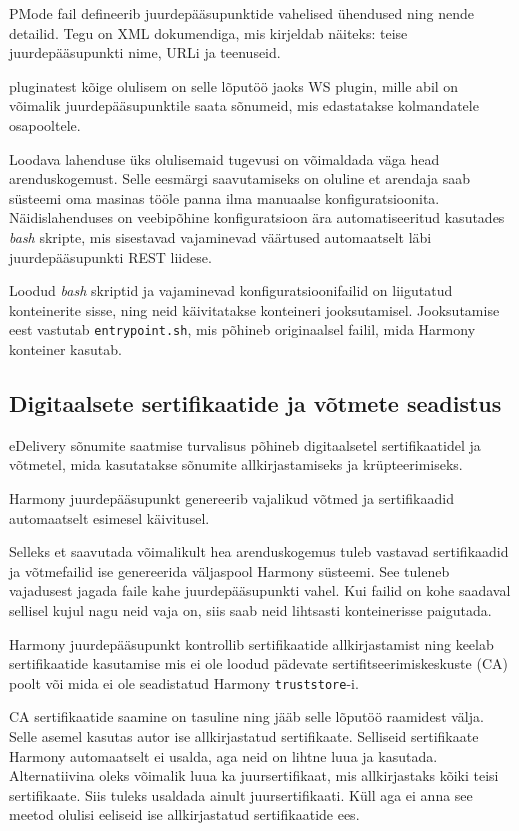 PMode fail defineerib juurdepääsupunktide vahelised ühendused ning nende detailid. Tegu
on XML dokumendiga, mis kirjeldab näiteks: teise juurdepääsupunkti nime, URLi ja teenuseid. 

pluginatest kõige olulisem on selle lõputöö jaoks WS plugin, 
mille abil on võimalik juurdepääsupunktile saata sõnumeid, mis edastatakse kolmandatele osapooltele.

Loodava lahenduse üks olulisemaid tugevusi on võimaldada väga head arenduskogemust.
Selle eesmärgi saavutamiseks on oluline et arendaja 
saab süsteemi oma masinas tööle panna ilma manuaalse konfiguratsioonita.
Näidislahenduses on veebipõhine konfiguratsioon ära automatiseeritud kasutades \textit{bash} skripte,
mis sisestavad vajaminevad väärtused automaatselt läbi juurdepääsupunkti REST liidese.

Loodud \textit{bash} skriptid ja vajaminevad konfiguratsioonifailid on liigutatud konteinerite sisse,
ning neid käivitatakse konteineri jooksutamisel. Jooksutamise eest vastutab \texttt{entrypoint.sh},
mis põhineb originaalsel failil, mida Harmony konteiner kasutab.


\subsection{Digitaalsete sertifikaatide ja võtmete seadistus}
eDelivery sõnumite saatmise turvalisus põhineb digitaalsetel sertifikaatidel ja võtmetel, 
mida kasutatakse sõnumite allkirjastamiseks ja krüpteerimiseks.

Harmony juurdepääsupunkt genereerib vajalikud võtmed ja sertifikaadid automaatselt esimesel käivitusel.

Selleks et saavutada võimalikult hea arenduskogemus tuleb vastavad sertifikaadid ja võtmefailid 
ise genereerida väljaspool Harmony süsteemi. 
See tuleneb vajadusest jagada faile kahe juurdepääsupunkti vahel. 
Kui failid on kohe saadaval sellisel kujul nagu neid vaja on, 
siis saab neid lihtsasti konteinerisse paigutada.

Harmony juurdepääsupunkt kontrollib sertifikaatide allkirjastamist ning keelab
sertifikaatide kasutamise mis ei ole loodud pädevate sertifitseerimiskeskuste (CA) poolt või mida
ei ole seadistatud Harmony \texttt{truststore}-i.

CA sertifikaatide saamine on tasuline ning jääb selle lõputöö raamidest välja. 
Selle asemel kasutas autor ise allkirjastatud sertifikaate.
Selliseid sertifikaate Harmony automaatselt ei usalda, aga neid on lihtne luua ja kasutada. 
Alternatiivina oleks võimalik luua ka juursertifikaat, mis allkirjastaks kõiki teisi sertifikaate.
Siis tuleks usaldada ainult juursertifikaati. Küll aga ei anna see meetod olulisi eeliseid 
ise allkirjastatud sertifikaatide ees.

